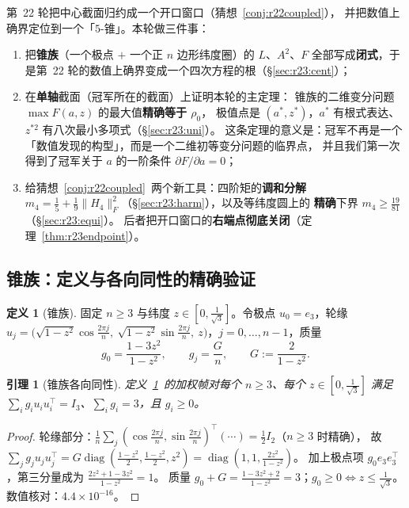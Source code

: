 \documentclass[UTF8,11pt]{ctexart}
\newtheorem{lemma}[theorem]{引理}
\theoremstyle{definition}
\newtheorem{definition}[theorem]{定义}
\begin{document}
第~22 轮把中心截面归约成一个开口窗口（猜想~\ref{conj:r22coupled}），
并把数值上确界定位到一个「$5$-锥」。本轮做三件事：
\begin{enumerate}\itemsep2pt
\item[(i)] 把\textbf{锥族}（一个极点 $+$ 一个正 $n$ 边形纬度圈）的 $L$、$A^2$、$F$
全部写成\textbf{闭式}，于是第~22 轮的数值上确界变成一个四次方程的根（\S\ref{sec:r23:cent}）；
\item[(ii)] 在\textbf{单轴}截面（冠军所在的截面）上证明本轮的主定理：
锥族的二维变分问题 $\max F(a,z)$ 的最大值\textbf{精确等于 $\rho_0$}，
极值点是 $(a^*,z^*)$，$a^*$ 有根式表达、$z^{*2}$ 有八次最小多项式（\S\ref{sec:r23:uni}）。
这条定理的意义是：冠军不再是一个「数值发现的构型」，而是一个二维初等变分问题的临界点，
并且我们第一次得到了冠军关于 $a$ 的一阶条件 $\partial F/\partial a=0$；
\item[(iii)] 给猜想~\ref{conj:r22coupled}~两个新工具：四阶矩的\textbf{调和分解}
$m_4=\frac15+\frac19\|H_4\|_F^2$（\S\ref{sec:r23:harm}），以及等纬度圆上的
\textbf{精确}下界 $m_4\ge\frac{19}{81}$（\S\ref{sec:r23:equi}）。
后者把开口窗口的\textbf{右端点彻底关闭}（定理~\ref{thm:r23endpoint}）。
\end{enumerate}

\subsection{锥族：定义与各向同性的精确验证}\label{sec:r23:cone}

\begin{definition}[锥族]\label{def:r23cone}
固定 $n\ge3$ 与纬度 $z\in[0,\frac1{\sqrt3}]$。令极点 $u_0=e_3$，轮缘
$u_j=\bigl(\sqrt{1-z^2}\cos\frac{2\pi j}n,\ \sqrt{1-z^2}\sin\frac{2\pi j}n,\ z\bigr)$，$j=0,\dots,n-1$，质量
\begin{equation}\label{eq:r23mass}
g_0=\frac{1-3z^2}{1-z^2},\qquad g_j=\frac Gn,\qquad G:=\frac2{1-z^2}.
\end{equation}
\end{definition}

\begin{lemma}[锥族各向同性]\label{lem:r23iso}
定义~\ref{def:r23cone}~的加权帧对每个 $n\ge3$、每个 $z\in[0,\frac1{\sqrt3}]$ 满足
$\sum_ig_iu_iu_i^\top=I_3$、$\sum_ig_i=3$，且 $g_i\ge0$。
\end{lemma}

\begin{proof}
轮缘部分：$\frac1n\sum_j(\cos\frac{2\pi j}n,\sin\frac{2\pi j}n)^\top(\cdots)=\frac12I_2$（$n\ge3$ 时精确），
故 $\sum_{j}g_ju_ju_j^\top=G\operatorname{diag}(\frac{1-z^2}2,\frac{1-z^2}2,z^2)
=\operatorname{diag}(1,1,\frac{2z^2}{1-z^2})$。
加上极点项 $g_0e_3e_3^\top$，第三分量成为 $\frac{2z^2+1-3z^2}{1-z^2}=1$。
质量 $g_0+G=\frac{1-3z^2+2}{1-z^2}=3$；$g_0\ge0\iff z\le\frac1{\sqrt3}$。
数值核对：$4.4\times10^{-16}$。
\end{proof}
\end{document}
